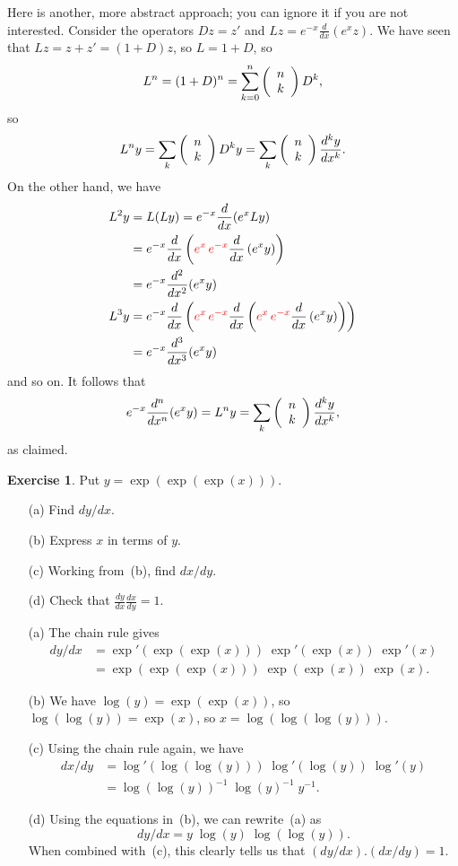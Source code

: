 \documentclass[a4paper]{book}
\theoremstyle{definition}
\newtheorem{exercise}[theorem]{Exercise}
\renewenvironment{solution}{\SolutionInline}{\endSolutionInline}
\begin{document}
\begin{solution}
 Here is another, more abstract approach; you can ignore it if you are
 not interested.  Consider the operators $Dz=z'$ and
 $Lz=e^{-x}\frac{d}{dx}(e^xz)$.  We have seen that $Lz=z+z'=(1+D)z$,
 so $L=1+D$, so 
 \[ L^n=(1+D)^n = \sum_{k=0}^n \left(\begin{array}{c}{n}\\{k}\end{array}\right) D^k, \]
 so
 \[ L^ny = \sum_k \left(\begin{array}{c}{n}\\{k}\end{array}\right) D^ky = 
     \sum_k \left(\begin{array}{c}{n}\\{k}\end{array}\right)\frac{d^ky}{dx^k}.
 \]
 On the other hand, we have
 \begin{align*}
  L^2y &= L(Ly) = e^{-x}\frac{d}{dx}(e^xLy) \\
       &= e^{-x}\frac{d}{dx}\left(
           {\color{red}e^x\, e^{-x}}\frac{d}{dx}\left(e^x y\right)\right) \\
       &= e^{-x}\frac{d^2}{dx^2}(e^xy) \\
  L^3y &= e^{-x} \frac{d}{dx}\left( {\color{red}e^x \, e^{-x}}
                 \frac{d}{dx}\left( {\color{red}e^x \, e^{-x}}
                 \frac{d}{dx}\left( e^x y \right)\right)\right) \\
       &= e^{-x} \frac{d^3}{dx^3}(e^xy)
 \end{align*}
 and so on.  It follows that
 \[ e^{-x}\frac{d^n}{dx^n}(e^x y) = L^ny = 
         \sum_k \left(\begin{array}{c}{n}\\{k}\end{array}\right) \frac{d^ky}{dx^k},
 \]
 as claimed.
\end{solution}

\begin{exercise}
 Put $y=\exp(\exp(\exp(x)))$.
 \begin{itemize}
  \item[(a)] Find $dy/dx$.
  \item[(b)] Express $x$ in terms of $y$.
  \item[(c)] Working from~(b), find $dx/dy$.
  \item[(d)] Check that $\frac{dy}{dx}\frac{dx}{dy}=1$.
 \end{itemize}
\end{exercise}
\begin{solution}
 \begin{itemize}
  \item[(a)] The chain rule gives
   \begin{align*}
    dy/dx &= \exp'(\exp(\exp(x)))\;\exp'(\exp(x))\;\exp'(x) \\
          &= \exp(\exp(\exp(x)))\;\exp(\exp(x))\;\exp(x).
   \end{align*}
  \item[(b)] We have $\log(y)=\exp(\exp(x))$, so
   $\log(\log(y))=\exp(x)$, so $x=\log(\log(\log(y)))$.
  \item[(c)] Using the chain rule again, we have 
   \begin{align*}
    dx/dy &= \log'(\log(\log(y)))\;\log'(\log(y))\;\log'(y) \\
          &= \log(\log(y))^{-1}\;\log(y)^{-1}\; y^{-1}.
   \end{align*}
  \item[(d)] Using the equations in~(b), we can rewrite~(a) as 
   \[ dy/dx = y\;\log(y)\;\log(\log(y)). \]
   When combined with~(c), this clearly tells us that
   $(dy/dx).(dx/dy)=1$.  
 \end{itemize}
\end{solution}
\end{document}
